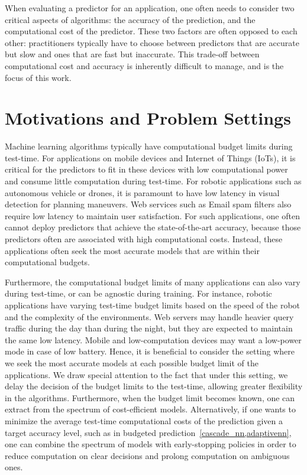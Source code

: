 

When evaluating a predictor for an application, one often needs to consider two critical aspects of algorithms: the accuracy of the prediction, and the computational cost of the predictor. These two factors are often opposed to each other: practitioners typically have to choose between predictors that are accurate but slow and ones that are fast but inaccurate. 
This trade-off between computational cost and accuracy is inherently difficult to manage, and is the focus of this work.


\section{Motivations and Problem Settings}

Machine learning algorithms typically have computational budget limits during test-time. For applications on mobile devices and Internet of Things (IoTs), it is critical for the predictors to fit in these devices with low computational power and consume little computation during test-time. For robotic applications such as autonomous vehicle or drones, it is paramount to have low latency in visual detection for planning maneuvers. Web services such as Email spam filters also require low latency to maintain user satisfaction. 
For such applications, one often cannot deploy predictors that achieve the state-of-the-art accuracy, because those predictors often are associated with high computational costs. Instead, these applications often seek the most accurate models that are within their computational budgets. 

Furthermore, the computational budget limits of many applications can also vary during test-time, or can be agnostic during training. 
For instance, robotic applications have varying test-time budget limits based on the speed of the robot and the complexity of the environments. 
Web servers may handle heavier query traffic during the day than during the night, but they are expected to maintain the same low latency. 
Mobile and low-computation devices may want a low-power mode in case of low battery. 
Hence, it is beneficial to consider the setting where we seek the most accurate models at each possible budget limit of the applications. 
We draw special attention to the fact that under this setting, we delay the decision of the budget limits to the test-time, allowing greater flexibility in the algorithms. Furthermore, when the budget limit becomes known, one can extract from the spectrum of cost-efficient models. Alternatively, if one wants to minimize the average test-time computational costs of the prediction given a target accuracy level, such as in budgeted prediction~\ref{cascade_nn,adaptivenn}, one can combine the spectrum of models with early-stopping policies in order to reduce computation on clear decisions and prolong computation on ambiguous ones.

